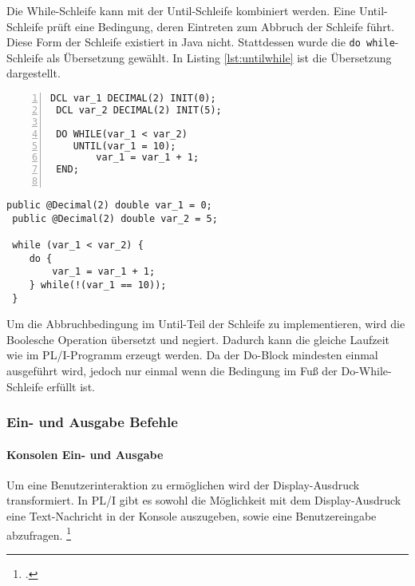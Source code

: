 Die While-Schleife kann mit der Until-Schleife kombiniert werden. Eine Until-Schleife prüft eine Bedingung, deren Eintreten zum Abbruch der Schleife führt. Diese Form der Schleife existiert in Java nicht. Stattdessen wurde die \verb+do while+-Schleife als Übersetzung gewählt. In Listing \ref{lst:untilwhile} ist die Übersetzung dargestellt.

\begin{minipage}[b]{0.48\linewidth}
	\centering
	\lstset{language=PL/I,label=SliceExaple}
	\begin{lstlisting}[frame=single, numbers=left, mathescape,%
	caption={While-Until-Schleife}, label={lst:untilwhile}, basicstyle=\fontsize{9}{13}\selectfont\ttfamily]
 DCL var_1 DECIMAL(2) INIT(0);
 DCL var_2 DECIMAL(2) INIT(5);
 
 DO WHILE(var_1 < var_2) 
 	UNTIL(var_1 = 10);
		var_1 = var_1 + 1;
 END;
 
	\end{lstlisting}
\end{minipage}
\hspace{0.5cm}
\begin{minipage}[b]{0.48\linewidth}
	\centering
	\lstset{language=Java,label=SliceExaple}
	\begin{lstlisting}[frame=single, mathescape,%
	title={" "}, basicstyle=\fontsize{9}{13}\selectfont\ttfamily]
 public @Decimal(2) double var_1 = 0;
 public @Decimal(2) double var_2 = 5;
	
 while (var_1 < var_2) {
 	do {
 		var_1 = var_1 + 1;
 	} while(!(var_1 == 10));
 }
	\end{lstlisting}
\end{minipage} 

Um die Abbruchbedingung im Until-Teil der Schleife zu implementieren, wird die Boolesche Operation übersetzt und negiert. Dadurch kann die gleiche Laufzeit wie im PL/I-Programm erzeugt werden. Da der Do-Block mindesten einmal ausgeführt wird, jedoch nur einmal wenn die Bedingung im Fuß der Do-While-Schleife erfüllt ist.

\pagebreak
\subsubsection{Ein- und Ausgabe Befehle}
\paragraph{Konsolen Ein- und Ausgabe}
Um eine Benutzerinteraktion zu ermöglichen wird der Display-Ausdruck transformiert.
In PL/I gibt es sowohl die Möglichkeit mit dem Display-Ausdruck eine Text-Nachricht in der Konsole auszugeben, sowie eine Benutzereingabe abzufragen. \footcite[Vgl. ][S. 264ff.]{pliref}

